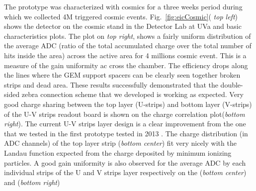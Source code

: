 %
The prototype was characterized with cosmics for a three weeks period during which we collected 4M triggered cosmic events. Fig.~\ref{fig:eicCosmic}( {\it top left})  shows the detector on the cosmic stand  in the Detector Lab at UVa and basic characteristics plots.  The plot on {\it top right}, shows a fairly uniform distribution of the average ADC (ratio of the total accumulated charge over the total number of hits inside the area)  across  the active area for 4 millions cosmic event. This is a measure of the gain uniformity ac cross the chamber. The efficiency drops along the lines where the GEM support spacers can be clearly seen together broken strips and dead area.  These results successfully demonstrated   that the double-sided zebra connection scheme that we developed is working as expected. Very good  charge sharing  between the top layer (U-strips) and bottom layer (V-strips) of the U-V strips readout board  is shown on the charge correlation plot({\it bottom right}). The current U-V strips layer design is a clear improvement from the  one that we tested in the first prototype tested in 2013 \cite{Gnanvo:2015xda}. The  charge distribution (in ADC channels) of the top layer strip ({\it bottom center}) fit very nicely with the Landau function expected from the charge deposited by minimum ionizing particles. A good gain uniformity is also observed for the average ADC by each individual strips of the U and V strips layer respectively on the ({\it bottom center}) and  ({\it bottom right})  
%
%
%
